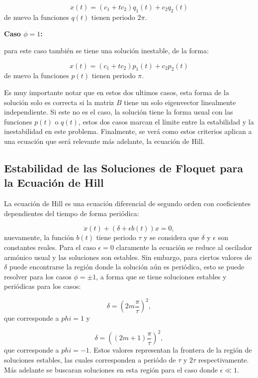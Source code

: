\documentclass[a4paper,10pt]{report}
\begin{document}
\begin{equation}
x(t) = (c_1 + tc_2)q_1(t) + c_2q_2(t)
\end{equation} de nuevo la funciones $q(t)$ tienen periodo $2\pi$.

\textbf{Caso $\phi = 1$:}

para este caso también se tiene una solución inestable, de la forma:

\begin{equation}
x(t) = (c_1 + tc_2)p_1(t) + c_2p_2(t)
\end{equation} de nuevo la funciones $p(t)$ tienen periodo $\pi$.

Es muy importante notar que en estos dos ultimos casos, esta forma de la solución solo es correcta si la matriz $B$ tiene un solo eigenvector linealmente independiente. Si este no es el caso, la solución tiene la forma usual con las funciones $p(t)$ o $q(t)$, estos dos casos marcan el límite entre la estabilidad y la inestabilidad en este problema. Finalmente, se verá como estos criterios aplican a una ecuación que será relevante más adelante, la ecuación de Hill.

\subsection{Estabilidad de las Soluciones de Floquet para la Ecuación de Hill}

La ecuación de Hill es una ecuación diferencial de segundo orden con coeficientes dependientes del tiempo de forma periódica:

\begin{equation}
\ddot{x}(t) + (\delta + \epsilon b(t))x = 0,
\end{equation} nuevamente, la función $b(t)$ tiene periodo $\tau$ y se considera que $\delta$ y $\epsilon$ son constantes reales. Para el caso $\epsilon = 0$ claramente la ecuación se reduce al oscilador armónico usual y las soluciones son estables. Sin embargo, para ciertos valores de $\delta$ puede encontrarse la región donde la solución aún es periódica, esto se puede resolver para los casos $\phi = \pm 1$, a forma que se tiene soluciones estables y periódicas para los casos:

\begin{equation}
\delta = (2m\frac{\pi}{\tau})^2, 
\end{equation} que corresponde a $phi=1$ y

\begin{equation}
\delta = ((2m+1)\frac{\pi}{\tau})^2,
\end{equation} que corresponde a $phi=-1$. Estos valores representan la frontera de la región de soluciones estables, las cuales corresponden a periódo de $\tau$ y $2\tau$ respectivamente. Más adelante se buscaran soluciones en esta región para el caso donde $\epsilon \ll 1$.
\end{document}
